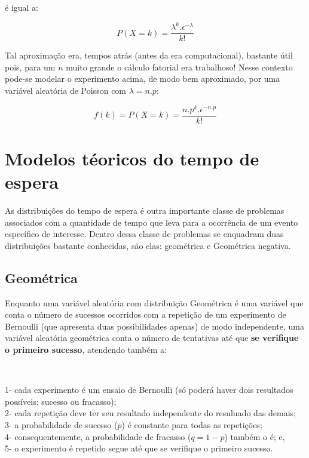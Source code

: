 \documentclass[
]{book}
\begin{document}
\hfill\break

é igual a:

\hfill\break

\[
P(X=k) = \frac{\lambda ^{k}. \epsilon^{-\lambda}} {k!}
\]

\hfill\break

Tal aproximação era, tempos atrás (antes da era computacional), bastante útil pois, para um \(n\) muito grande o cálculo fatorial era trabalhoso! Nesse contexto pode-se modelar o experimento acima, de modo bem aproximado, por uma variável aleatória de Poisson com \(\lambda=n . p\):

\[
f(k) = P(X=k) = \frac{n . p^{k}. \epsilon^{- n . p}} {k!}
\]

\hypertarget{modelos-tuxe9oricos-do-tempo-de-espera}{%
\section{Modelos téoricos do tempo de espera}\label{modelos-tuxe9oricos-do-tempo-de-espera}}

As distribuições do tempo de espera é outra importante classe de problemas associados com a quantidade de tempo que leva para a ocorrência de um evento específico de interesse. Dentro dessa classe de problemas se enquadram duas distribuições bastante conhecidas, são elas: geométrica e Geométrica negativa.

\hypertarget{geomuxe9trica-1}{%
\subsection{Geométrica}\label{geomuxe9trica-1}}

Enquanto uma variável aleatória com distribuição Geométrica é uma variável que conta o número de sucessos ocorridos com a repetição de um experimento de Bernoulli (que apresenta duas possibilidades apenas) de modo independente, uma variável aleatória geométrica conta o número de tentativas até que \textbf{se verifique o primeiro sucesso}, atendendo também a:

~

1- cada experimento é um ensaio de Bernoulli (só poderá haver dois resultados possíveis: sucesso ou fracasso);\\
2- cada repetição deve ter seu resultado independente do resuluado das demais;\\
3- a probabilidade de sucesso (\(p\)) é constante para todas as repetições;\\
4- consequentemente, a probabilidade de fracasso (\(q=1-p\)) também o é; e,\\
5- o experimento é repetido segue até que se verifique o primeiro sucesso.
\end{document}
